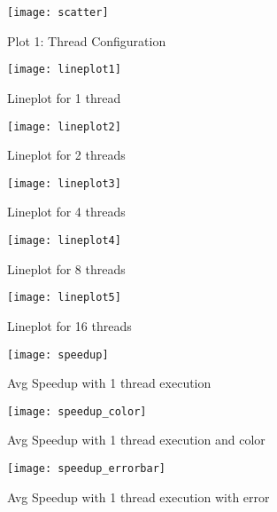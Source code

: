\documentclass{article}
\begin{document}
\begin{figure}
\texttt{[image: scatter]}
\caption{Plot 1: Thread Configuration}
\end{figure}
\begin{figure}
\texttt{[image: lineplot1]}
\caption{Lineplot for 1 thread}
\end{figure}
\begin{figure}
\texttt{[image: lineplot2]}
\caption{Lineplot for 2 threads}
\end{figure}
\begin{figure}
\texttt{[image: lineplot3]}
\caption{Lineplot for 4 threads}
\end{figure}
\begin{figure}
\texttt{[image: lineplot4]}
\caption{Lineplot for 8 threads}
\end{figure}
\begin{figure}
\texttt{[image: lineplot5]}
\caption{Lineplot for 16 threads}
\end{figure}
\begin{figure}
\texttt{[image: speedup]}
\caption{Avg Speedup with 1 thread execution}
\end{figure}
\begin{figure}
\texttt{[image: speedup\_color]}
\caption{Avg Speedup with 1 thread execution and color}
\end{figure}
\begin{figure}
\texttt{[image: speedup\_errorbar]}
\caption{Avg Speedup with 1 thread execution with error}
\end{figure}
\end{document}

